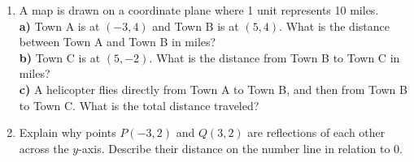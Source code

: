 \documentclass[12pt, letterpaper, fleqn]{article}
\newcommand{\blanklong}{\underline{\hspace{6.5cm}}}
\begin{document}
\vspace{3mm}
\begin{enumerate}[itemsep=1.5cm, leftmargin=0.6cm]
\item A map is drawn on a coordinate plane where 1 unit represents 10 miles. \\
\textbf{a)} Town A is at $(-3, 4)$ and Town B is at $(5, 4)$. What is the distance between Town A and Town B in miles? \blanklong \\
\textbf{b)} Town C is at $(5, -2)$. What is the distance from Town B to Town C in miles? \blanklong \\
\textbf{c)} A helicopter flies directly from Town A to Town B, and then from Town B to Town C. What is the total distance traveled? \blanklong
\vspace{1.5cm}
\item Explain why points $P(-3, 2)$ and $Q(3, 2)$ are reflections of each other across the $y$-axis. Describe their distance on the number line in relation to 0.
\vspace{1.5cm}
\end{enumerate}
\newpage
\end{document}
